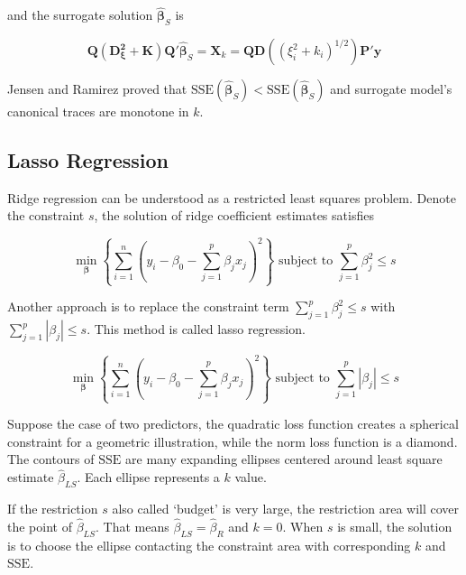 \documentclass[
  11pt,
  openany]{memoir}
\begin{document}
and the surrogate solution \(\boldsymbol{\hat\beta}_{S}\) is

\begin{equation}
\mathbf{Q(D^2_{\xi}+K)Q}'\boldsymbol{\hat\beta}_{S}=\mathbf{X}_k=\mathbf{QD}((\xi_i^2+k_i)^{1/2})\mathbf{P}'\mathbf{y}
\label{eq:surrogate-e}
\end{equation}

Jensen and Ramirez proved that \(\mathrm{SSE}(\boldsymbol{\hat\beta}_{S})< \mathrm{SSE}(\boldsymbol{\hat\beta}_{S})\) and surrogate model's canonical traces are monotone in \(k\).

\hypertarget{lasso-regression}{%
\subsection{Lasso Regression}\label{lasso-regression}}

Ridge regression can be understood as a restricted least squares problem. Denote the constraint \(s\), the solution of ridge coefficient estimates satisfies

\begin{equation}
\min_{\boldsymbol\beta}\left\{\sum_{i=1}^n\left(y_i-\beta_0-\sum_{j=1}^p\beta_jx_j\right)^2\right\}\text{ subject to } \sum_{j=1}^p\beta_j^2\le s
\end{equation}

Another approach is to replace the constraint term \(\sum_{j=1}^p\beta_j^2\le s\) with \(\sum_{j=1}^p|\beta_j|\le s\). This method is called lasso regression.

\begin{equation}
\min_{\boldsymbol\beta}\left\{\sum_{i=1}^n\left(y_i-\beta_0-\sum_{j=1}^p\beta_jx_j\right)^2\right\}\text{ subject to } \sum_{j=1}^p|\beta_j|\le s
\end{equation}

Suppose the case of two predictors, the quadratic loss function creates a spherical constraint for a geometric illustration, while the norm loss function is a diamond. The contours of \(\mathrm{SSE}\) are many expanding ellipses centered around least square estimate \(\hat\beta_{LS}\). Each ellipse represents a \(k\) value.

If the restriction \(s\) also called `budget' is very large, the restriction area will cover the point of \(\hat\beta_{LS}\). That means \(\hat\beta_{LS}=\hat\beta_{R}\) and \(k=0\).
When \(s\) is small, the solution is to choose the ellipse contacting the constraint area with corresponding \(k\) and \(\mathrm{SSE}\).
\end{document}
